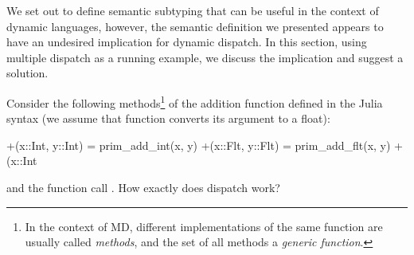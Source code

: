 We set out to define semantic subtyping that can be useful in the context
of dynamic languages, however, 
the semantic definition we presented
appears to have an undesired implication for dynamic dispatch.
In this section, using multiple dispatch as a running example,
we discuss the implication and suggest a solution.

Consider the following methods\footnote{In the context of MD, 
	different implementations of 
	the same function are usually called \emph{methods},
	and the set of all methods a \emph{generic function}.}
of the addition function defined in the Julia syntax
(we assume that function  converts its argument to a float):
\begin{lstminijl}
+(x::Int, y::Int) = prim_add_int(x, y) 
+(x::Flt, y::Flt) = prim_add_flt(x, y) 
+(x::Int%
\end{lstminijl}
and the function call .
How exactly does dispatch work?

